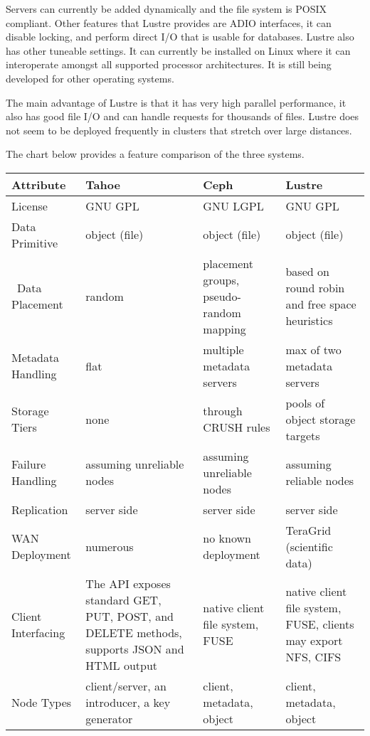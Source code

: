 \documentclass[11pt]{article}
\begin{document}
Servers can currently be added dynamically and the file system is 
POSIX compliant. Other features that Lustre provides are ADIO 
interfaces, it can disable locking, and perform direct I/O that is 
usable for databases. Lustre also has other tuneable settings. It can 
currently be installed on Linux where it can interoperate amongst all 
supported processor architectures. It is still being developed for 
other operating systems.

The main advantage of Lustre is that it has very high parallel 
performance, it also has good file I/O and can handle requests for 
thousands of files. Lustre does not seem to be deployed frequently 
in clusters that stretch over large distances.

The chart below provides a feature comparison of the three systems.

\begin{center}
    \begin{tabular}{ | l | p{3cm} | p{3cm} | p{3cm} |}
    \hline
    Attribute & Tahoe & Ceph & Lustre \\ \hline
    License & GNU GPL & GNU LGPL & GNU GPL \\ \hline
    Data Primitive & object (file) & object (file) &
    object (file) \\ \hline\
    Data Placement & random & placement groups, pseudo-random mapping &   
    based on round robin and free space heuristics \\ \hline
    Metadata Handling & flat & multiple metadata servers & 
    max of two  metadata servers  \\ \hline
    Storage Tiers & none & through CRUSH rules & pools of object storage
    targets \\ \hline
    Failure Handling & assuming unreliable nodes & assuming unreliable
    nodes & assuming reliable nodes \\ \hline
    Replication & server side & server side & server side \\ \hline
    WAN Deployment & numerous & no known deployment & TeraGrid (scientific
    data) \\ \hline
    Client Interfacing &  The API exposes standard GET, PUT, POST, and
    DELETE methods, supports JSON and HTML output & native client file
    system, FUSE & native client file system, FUSE, clients may export
    NFS, CIFS \\ \hline
    Node Types & client/server, an introducer, a key generator & client,
    metadata, object & client, metadata, object \\ \hline
    \end{tabular}
\end{center}
\end{document}
